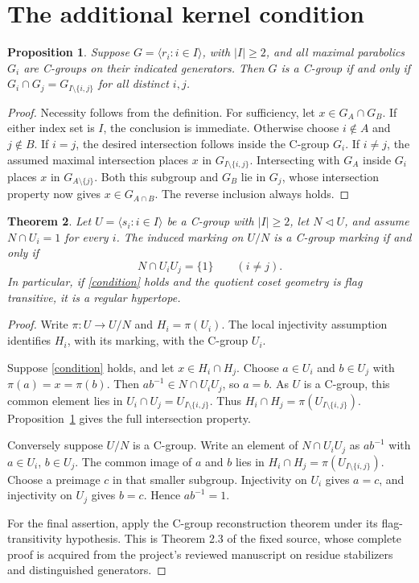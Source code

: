 \documentclass[11pt,a4paper]{article}
\newtheorem{proposition}{Proposition}
\newtheorem{theorem}[proposition]{Theorem}
\newcommand{\gen}[1]{\langle #1\rangle}
\begin{document}
\section{The additional kernel condition}

\begin{proposition}\label{maximal}
Suppose $G=\gen{r_i:i\in I}$, with $|I|\geq2$, and all maximal
parabolics $G_i$ are C-groups on their indicated generators.
Then $G$ is a C-group if and only if
$G_i\cap G_j=G_{I\setminus\{i,j\}}$ for all distinct $i,j$.
\end{proposition}
\begin{proof}
Necessity follows from the definition. For sufficiency, let
$x\in G_A\cap G_B$. If either index set is $I$, the conclusion is
immediate. Otherwise choose $i\notin A$ and $j\notin B$.
If $i=j$, the desired intersection follows inside the C-group $G_i$.
If $i\ne j$, the assumed maximal intersection places $x$ in
$G_{I\setminus\{i,j\}}$. Intersecting with $G_A$ inside $G_i$
places $x$ in $G_{A\setminus\{j\}}$. Both this subgroup and $G_B$
lie in $G_j$, whose intersection property now gives
$x\in G_{A\cap B}$. The reverse inclusion always holds.
\end{proof}

\begin{theorem}\label{kernel}
Let $U=\gen{s_i:i\in I}$ be a C-group with $|I|\geq2$,
let $N\triangleleft U$, and assume $N\cap U_i=1$ for every $i$.
The induced marking on $U/N$ is a C-group marking if and only if
\begin{equation}\label{condition}
 N\cap U_iU_j=\{1\}\qquad(i\ne j).
\end{equation}
In particular, if \eqref{condition} holds and the quotient coset
geometry is flag transitive, it is a regular hypertope.
\end{theorem}
\begin{proof}
Write $\pi:U\longrightarrow U/N$ and $H_i=\pi(U_i)$.
The local injectivity assumption identifies $H_i$, with its marking,
with the C-group $U_i$.

Suppose \eqref{condition} holds, and let
$x\in H_i\cap H_j$. Choose $a\in U_i$ and $b\in U_j$ with
$\pi(a)=x=\pi(b)$. Then $ab^{-1}\in N\cap U_iU_j$, so $a=b$.
As $U$ is a C-group, this common element lies in
$U_i\cap U_j=U_{I\setminus\{i,j\}}$. Thus
$H_i\cap H_j=\pi(U_{I\setminus\{i,j\}})$.
Proposition~\ref{maximal} gives the full intersection property.

Conversely suppose $U/N$ is a C-group. Write an element of
$N\cap U_iU_j$ as $ab^{-1}$ with $a\in U_i$, $b\in U_j$.
The common image of $a$ and $b$ lies in
$H_i\cap H_j=\pi(U_{I\setminus\{i,j\}})$. Choose a preimage
$c$ in that smaller subgroup. Injectivity on $U_i$ gives $a=c$,
and injectivity on $U_j$ gives $b=c$. Hence $ab^{-1}=1$.

For the final assertion, apply the C-group reconstruction theorem
under its flag-transitivity hypothesis. This is Theorem 2.3 of
the fixed source, whose complete proof is acquired from the project's
reviewed manuscript on residue stabilizers and distinguished generators.
\end{proof}
\end{document}
